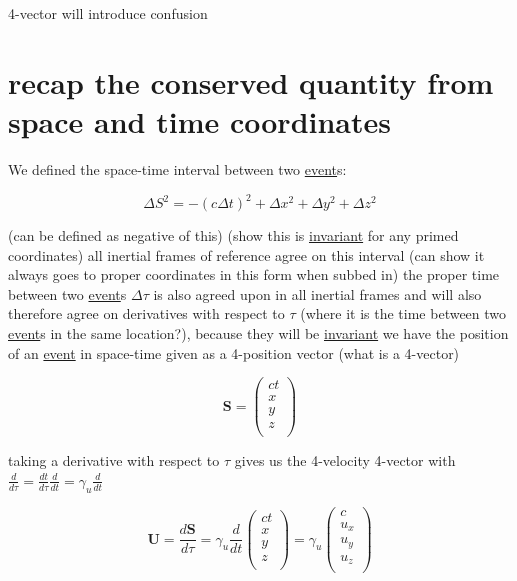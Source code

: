4-vector will introduce confusion

\section{recap the conserved quantity from space and time coordinates}

We defined the space-time interval between two \hyperlink{def-event}{event}s:

\begin{equation}
	\Delta S^2 = -(c\Delta t)^2 +\Delta x^2 +\Delta y^2 +\Delta z^2
\end{equation}

(can be defined as negative of this) (show this is \hyperlink{def-lorentz-invariant}{invariant} for any primed coordinates)
all inertial frames of reference agree on this interval (can show it always goes to proper coordinates in this form when subbed in)
the proper time between two \hyperlink{def-event}{event}s $\Delta\tau$ is also agreed upon in all inertial frames
and will also therefore agree on derivatives with respect to $\tau$ (where it is the time between two \hyperlink{def-event}{event}s in the same location?), because they will be \hyperlink{def-lorentz-invariant}{invariant}
we have the position of an \hyperlink{def-event}{event} in space-time given as a 4-position vector (what is a 4-vector)

\begin{equation}
	\mathbf{S} =
	\begin{pmatrix}
		ct \\
		x  \\
		y  \\
		z  \\
	\end{pmatrix}
\end{equation}

taking a derivative with respect to $\tau$ gives us the 4-velocity 4-vector with $\frac{d}{d\tau} = \frac{dt}{d\tau}\frac{d}{dt} = \gamma_u \frac{d}{dt} $

\begin{equation}
	\mathbf{U} = \frac{d\mathbf{S}}{d\tau} = \gamma_u \frac{d}{dt}
	\begin{pmatrix}
		ct \\
		x  \\
		y  \\
		z  \\
	\end{pmatrix}
	= \gamma_u
	\begin{pmatrix}
		c   \\
		u_x \\
		u_y \\
		u_z \\
	\end{pmatrix}
\end{equation}

